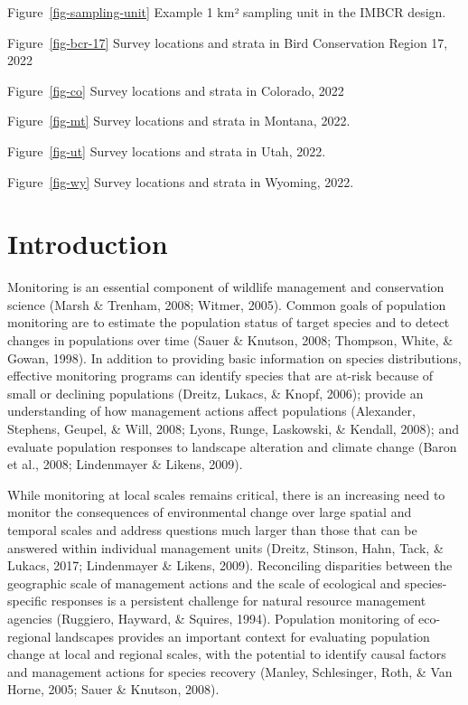 \documentclass[
  letterpaper,
  DIV=11,
  numbers=noendperiod,
  oneside]{scrreprt}
\begin{document}
Figure~\ref{fig-sampling-unit} Example 1 km² sampling unit in the IMBCR
design.

Figure~\ref{fig-bcr-17} Survey locations and strata in Bird Conservation
Region 17, 2022

Figure~\ref{fig-co} Survey locations and strata in Colorado, 2022

Figure~\ref{fig-mt} Survey locations and strata in Montana, 2022.

Figure~\ref{fig-ut} Survey locations and strata in Utah, 2022.

Figure~\ref{fig-wy} Survey locations and strata in Wyoming, 2022.


\hypertarget{introduction}{%
\chapter{Introduction}\label{introduction}}

Monitoring is an essential component of wildlife management and
conservation science (Marsh \& Trenham, 2008; Witmer, 2005). Common
goals of population monitoring are to estimate the population status of
target species and to detect changes in populations over time (Sauer \&
Knutson, 2008; Thompson, White, \& Gowan, 1998). In addition to
providing basic information on species distributions, effective
monitoring programs can identify species that are at-risk because of
small or declining populations (Dreitz, Lukacs, \& Knopf, 2006); provide
an understanding of how management actions affect populations
(Alexander, Stephens, Geupel, \& Will, 2008; Lyons, Runge, Laskowski, \&
Kendall, 2008); and evaluate population responses to landscape
alteration and climate change (Baron et al., 2008; Lindenmayer \&
Likens, 2009).

While monitoring at local scales remains critical, there is an
increasing need to monitor the consequences of environmental change over
large spatial and temporal scales and address questions much larger than
those that can be answered within individual management units (Dreitz,
Stinson, Hahn, Tack, \& Lukacs, 2017; Lindenmayer \& Likens, 2009).
Reconciling disparities between the geographic scale of management
actions and the scale of ecological and species-specific responses is a
persistent challenge for natural resource management agencies (Ruggiero,
Hayward, \& Squires, 1994). Population monitoring of eco-regional
landscapes provides an important context for evaluating population
change at local and regional scales, with the potential to identify
causal factors and management actions for species recovery (Manley,
Schlesinger, Roth, \& Van Horne, 2005; Sauer \& Knutson, 2008).
\end{document}
